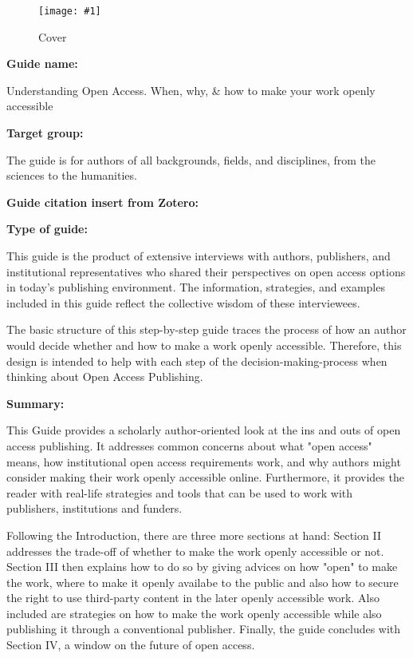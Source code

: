 \documentclass{article}
\newlength{\imgwidth}
\newcommand\scaledgraphics[2]{%
                
\settowidth{\imgwidth}{\texttt{[image: \#1]}}%
                
\setlength{\imgwidth}{\minof{\imgwidth}{#2\textwidth}}%
                
\texttt{[image: \#1]}%
                
}
\begin{document}
\begin{center}
\begin{figure}
\scaledgraphics{37cc2dfd-e350-4e29-acc3-9c7f815eb133.png}{0.5}
\caption*{Cover}\label{F36070241}
\end{figure}


\end{center}




\textbf{Guide name:} 

Understanding Open Access. When, why, \& how to make your work openly accessible


\textbf{Target group:}

The guide is for authors of all backgrounds, fields, and disciplines, from the sciences to the humanities.


\textbf{Guide citation insert from Zotero:} 

\autocite{rubow_understanding_2015}


\textbf{Type of guide:}

This guide is the product of extensive interviews with authors, publishers, and institutional representatives who shared their perspectives on open access options in today’s publishing environment. The information, strategies, and examples included in this guide reflect the collective wisdom of these interviewees.


The basic structure of this step-by-step guide traces the process of how an author would decide whether and how to make a work openly accessible. Therefore, this design is intended to help with each step of the decision-making-process when thinking about Open Access Publishing. 


\textbf{Summary:}

This Guide provides a scholarly author-oriented look at the ins and outs of open access publishing. It addresses common concerns about what "open access" means, how institutional open access requirements work, and why authors might consider making their work openly accessible online. Furthermore, it provides the reader with real-life strategies and tools that can be used to work with publishers, institutions and funders.


Following the Introduction, there are three more sections at hand: Section II addresses the trade-off of whether to make the work openly accessible or not. Section III then explains how to do so by giving advices on how "open" to make the work, where to make it openly availabe to the public and also how to secure the right to use third-party content in the later openly accessible work. Also included are strategies on how to make the work openly accessible while also publishing it through a conventional publisher. Finally, the guide concludes with Section IV, a window on the future of open access.
\end{document}
